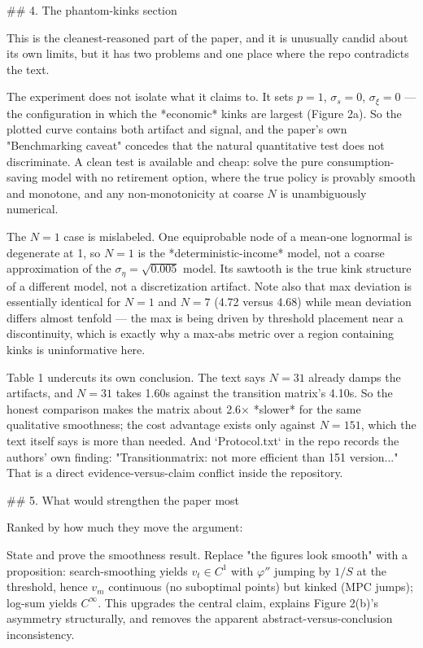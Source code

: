 ## 4. The phantom-kinks section

This is the cleanest-reasoned part of the paper, and it is unusually candid about its own limits, but it has two problems and one place where the repo contradicts the text.

The experiment does not isolate what it claims to. It sets $p=1$, $\sigma_s=0$, $\sigma_\xi=0$ — the configuration in which the *economic* kinks are largest (Figure 2a). So the plotted curve contains both artifact and signal, and the paper's own "Benchmarking caveat" concedes that the natural quantitative test does not discriminate. A clean test is available and cheap: solve the pure consumption-saving model with no retirement option, where the true policy is provably smooth and monotone, and any non-monotonicity at coarse $N$ is unambiguously numerical.

The $N=1$ case is mislabeled. One equiprobable node of a mean-one lognormal is degenerate at 1, so $N=1$ is the *deterministic-income* model, not a coarse approximation of the $\sigma_\eta=\sqrt{0.005}$ model. Its sawtooth is the true kink structure of a different model, not a discretization artifact. Note also that max deviation is essentially identical for $N=1$ and $N=7$ (4.72 versus 4.68) while mean deviation differs almost tenfold — the max is being driven by threshold placement near a discontinuity, which is exactly why a max-abs metric over a region containing kinks is uninformative here.

Table 1 undercuts its own conclusion. The text says $N=31$ already damps the artifacts, and $N=31$ takes 1.60s against the transition matrix's 4.10s. So the honest comparison makes the matrix about 2.6× *slower* for the same qualitative smoothness; the cost advantage exists only against $N=151$, which the text itself says is more than needed. And `Protocol.txt` in the repo records the authors' own finding: "Transitionmatrix: not more efficient than 151 version..." That is a direct evidence-versus-claim conflict inside the repository.

## 5. What would strengthen the paper most

Ranked by how much they move the argument:

State and prove the smoothness result. Replace "the figures look smooth" with a proposition: search-smoothing yields $v_t\in C^1$ with $\varphi''$ jumping by $1/S$ at the threshold, hence $v_m$ continuous (no suboptimal points) but kinked (MPC jumps); log-sum yields $C^\infty$. This upgrades the central claim, explains Figure 2(b)'s asymmetry structurally, and removes the apparent abstract-versus-conclusion inconsistency.

